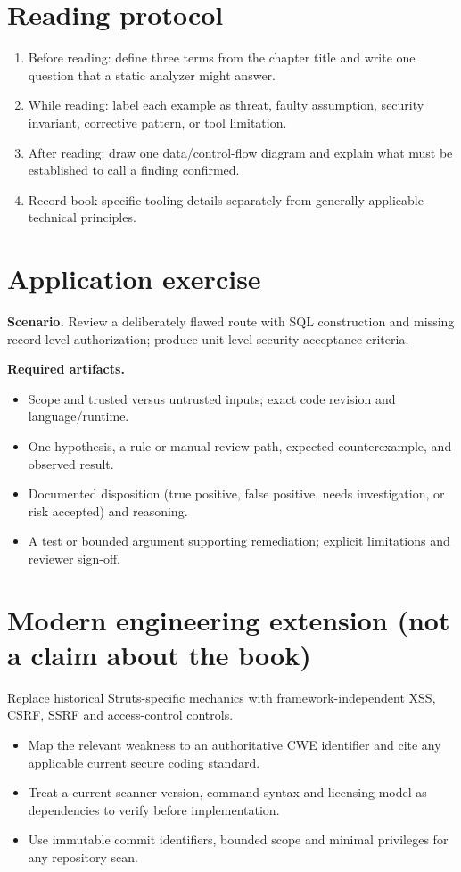 \documentclass[10pt,letterpaper]{article}
\begin{document}
\section{Reading protocol}
\begin{enumerate}
\item Before reading: define three terms from the chapter title and write one question that a static analyzer might answer.
\item While reading: label each example as threat, faulty assumption, security invariant, corrective pattern, or tool limitation.
\item After reading: draw one data/control-flow diagram and explain what must be established to call a finding confirmed.
\item Record book-specific tooling details separately from generally applicable technical principles.
\end{enumerate}

\section{Application exercise}
\textbf{Scenario.} Review a deliberately flawed route with SQL construction and missing record-level authorization; produce unit-level security acceptance criteria.

\textbf{Required artifacts.}\begin{itemize}
\item Scope and trusted versus untrusted inputs; exact code revision and language/runtime.
\item One hypothesis, a rule or manual review path, expected counterexample, and observed result.
\item Documented disposition (true positive, false positive, needs investigation, or risk accepted) and reasoning.
\item A test or bounded argument supporting remediation; explicit limitations and reviewer sign-off.
\end{itemize}

\section{Modern engineering extension (not a claim about the book)}
Replace historical Struts-specific mechanics with framework-independent XSS, CSRF, SSRF and access-control controls.

\begin{itemize}
\item Map the relevant weakness to an authoritative CWE identifier and cite any applicable current secure coding standard.
\item Treat a current scanner version, command syntax and licensing model as dependencies to verify before implementation.
\item Use immutable commit identifiers, bounded scope and minimal privileges for any repository scan.
\end{itemize}
\end{document}
